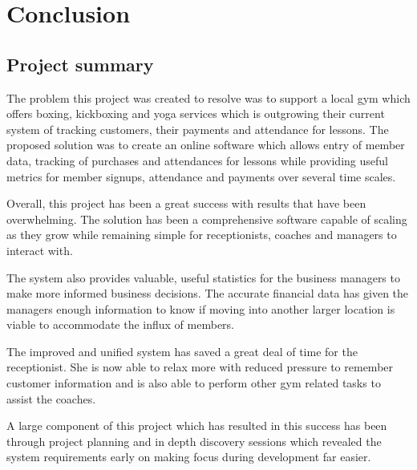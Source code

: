 \chapter{Conclusion} %
\label{Chapter7} %


\section{Project summary}

The problem this project was created to resolve was to support a local gym which offers boxing, kickboxing and yoga services which is outgrowing their current system of tracking customers, their payments and attendance for lessons. The proposed solution was to create an online software which allows entry of member data, tracking of purchases and attendances for lessons while providing useful metrics for member signups, attendance and payments over several time scales.

Overall, this project has been a great success with results that have been overwhelming. The solution has been a comprehensive software capable of scaling as they grow while remaining simple for receptionists, coaches and managers to interact with.

The system also provides valuable, useful statistics for the business managers to make more informed business decisions. The accurate financial data has given the managers enough information to know if moving into another larger location is viable to accommodate the influx of members.

The improved and unified system has saved a great deal of time for the receptionist. She is now able to relax more with reduced pressure to remember customer information and is also able to perform other gym related tasks to assist the coaches.

A large component of this project which has resulted in this success has been through project planning and in depth discovery sessions which revealed the system requirements early on making focus during development far easier.

